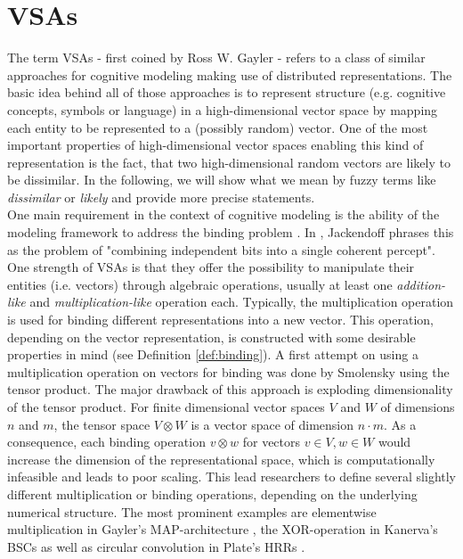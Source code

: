 \section{\aclp{VSA}}
The term \acfp{VSA} - first coined by Ross W. Gayler \cite{Gayler2003} - refers to a class of similar approaches for cognitive modeling making use of distributed representations.
The basic idea behind all of those approaches is to represent structure (e.g. cognitive concepts, symbols or language) in a high-dimensional vector space by mapping each entity to be represented to a (possibly random) vector.
One of the most important properties of high-dimensional vector spaces enabling this kind of representation is the fact, that two high-dimensional random vectors are likely to be dissimilar.
In the following, we will show what we mean by fuzzy terms like \emph{dissimilar} or \emph{likely} and provide more precise statements.\\
One main requirement in the context of cognitive modeling is the ability of the modeling framework to address the binding problem \cite{Treisman1999}.
In \cite{Jackendoff2002}, Jackendoff phrases this as the problem of "combining independent bits into a single coherent percept". 
One strength of \acp{VSA} is that they offer the possibility to manipulate their entities (i.e. vectors) through algebraic operations, usually at least one \emph{addition-like} and \emph{multiplication-like} operation each.
Typically, the multiplication operation is used for binding different representations into a new vector.
This operation, depending on the vector representation, is constructed with some desirable properties in mind (see Definition \ref{def:binding}).
A first attempt on using a multiplication operation on vectors for binding was done by Smolensky \cite{Smolensky1990} using the tensor product.
The major drawback of this approach is exploding dimensionality of the tensor product.
For finite dimensional vector spaces  $V$ and $W$ of dimensions $n$ and $m$, the tensor space $V \otimes W$ is a vector space of dimension $n\cdot m$.
As a consequence, each binding operation $v\otimes w$ for vectors $v \in V, w \in W$ would increase the dimension of the representational space, which is computationally infeasible and leads to poor scaling.
This lead researchers to define several slightly different multiplication or binding operations, depending on the underlying numerical structure.
The most prominent examples are elementwise multiplication in Gayler's \ac{MAP}-architecture \cite{Gayler1998}, the XOR-operation in Kanerva's \acp{BSC} \cite{Kanerva2000, Kanerva2009} as well as circular convolution in Plate's \acp{HRR} \cite{Plate1991, Plate1994}.

